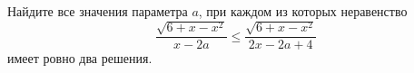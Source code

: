 \begin{ex}
	\begin{condition}
		Найдите все значения параметра \( a \), при каждом из которых неравенство \[ \dfrac{\sqrt{6+x-x^2}}{x-2a}\le\dfrac{\sqrt{6+x-x^2}}{2x-2a+4} \] имеет ровно два решения.
	\end{condition}
\end{ex}